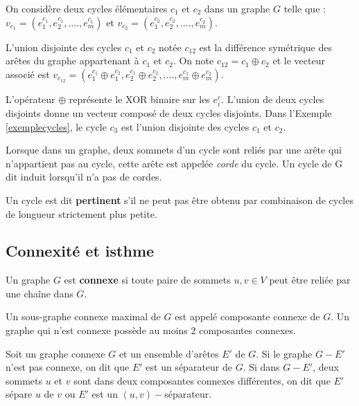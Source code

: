 On considère deux cycles élémentaires $c_1$ et $c_2$ dans un graphe $G$ telle que : $v_{c_1} = (e_1^{c_1}, e_2^{c_1}, ...., e_m^{c_1})$ et $v_{c_2} = (e_1^{c_2}, e_2^{c_2}, ...., e_m^{c_2})$.

\begin{definition}
L'union disjointe des cycles $c_1$ et $c_2$ notée $c_{12}$ est la différence symétrique des arêtes du graphe appartenant à $c_1$ et $c_2$. On note $c_{12} = c_1 \oplus c_2$ et le vecteur associé est $v_{c_{12}} = (e_1^{c_1} \oplus e_1^{c_2}, e_2^{c_1} \oplus e_2^{c_2}, ...., e_m^{c_1} \oplus e_m^{c_2})$.
\end{definition}

L'opérateur $\oplus$ représente le XOR binaire sur les $e_i^c$. L'union de deux cycles disjoints donne un vecteur composé de deux cycles disjoints. Dans l'Exemple \ref{exemplecycles}, le cycle $c_3$ est l'union disjointe des cycles $c_1$ et $c_2$.

Lorsque dans un graphe, deux sommets d'un cycle sont reliés par une arête qui n'appartient pas au cycle, cette arête est appelée \textit{corde} du cycle. Un cycle de G dit induit lorsqu'il n'a pas de cordes.

\begin{definition}
Un cycle est dit \textbf{pertinent} s'il ne peut pas être obtenu par combinaison de cycles de longueur strictement plus petite.
\end{definition}

\subsection{Connexité et isthme}

\begin{definition}
Un graphe $G$ est \textbf{connexe} si toute paire de sommets $u,v \in V$ peut être reliée par une chaîne dans $G$.
\end{definition}
Un sous-graphe connexe maximal de $G$ est appelé composante connexe de $G$. Un graphe qui n'est connexe possède au moins $2$ composantes connexes.

Soit un graphe connexe $G$ et un ensemble d'arêtes $E'$ de $G$. Si le graphe $G -  E'$ n'est pas connexe, on dit que $E'$ est un séparateur de $G$. Si dans $G - E'$, deux sommets $u$ et $v$ sont dans deux composantes connexes différentes, on dit que $E'$ sépare $u$ de $v$ ou $E'$ est un $(u, v)-$séparateur.

